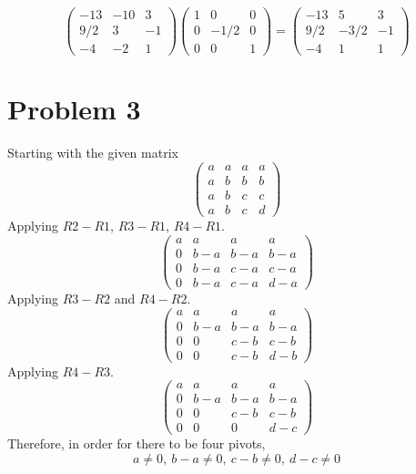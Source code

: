\documentclass{article}
\begin{document}
\[
    \begin{pmatrix}
        -13 & -10 & 3 \\
        9/2 & 3 & -1 \\
        -4 & -2 & 1
    \end{pmatrix}
    \begin{pmatrix}
        1 & 0 & 0 \\
        0 & -1/2 & 0 \\
        0 & 0 & 1
    \end{pmatrix}
    =
    \begin{pmatrix}
        -13 & 5 & 3 \\
        9/2 & -3/2 & -1 \\
        -4 & 1 & 1
    \end{pmatrix}
\]

\section*{Problem 3}

Starting with the given matrix
\[
    \begin{pmatrix}
        a & a & a & a \\
        a & b & b & b \\
        a & b & c & c \\
        a & b & c & d
    \end{pmatrix}
\]
Applying $ R2 - R1 $, $R3 - R1 $, $ R4 - R1 $.
\[
    \begin{pmatrix}
        a & a & a & a \\
        0 & b - a & b - a & b - a \\
        0 & b - a & c - a & c - a \\
        0 & b - a & c - a & d - a
    \end{pmatrix}
\]
Applying $ R3 - R2 $ and $ R4 - R2 $.
\[
    \begin{pmatrix}
        a & a & a & a \\
        0 & b - a & b - a & b - a \\
        0 & 0 & c - b & c - b \\
        0 & 0 & c - b & d - b
    \end{pmatrix}
\]
Applying $ R4 - R3 $.
\[
    \begin{pmatrix}
        a & a & a & a \\
        0 & b - a & b - a & b - a \\
        0 & 0 & c - b & c - b \\
        0 & 0 & 0 & d - c
    \end{pmatrix}
\]
Therefore, in order for there to be four pivots,
$$ a \neq 0,\ b - a \neq 0,\ c - b \neq 0,\ d - c \neq 0 $$
\end{document}
